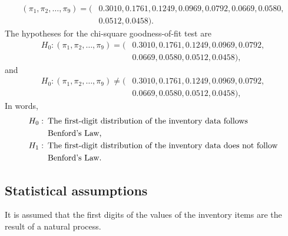 \begin{equation*}
\begin{aligned}
(\pi_1,\pi_2,\ldots,\pi_9) = (&0.3010, 0.1761, 0.1249, 0.0969, 0.0792, 0.0669, 0.0580, \\
&0.0512, 0.0458).
\end{aligned}
\end{equation*}
The hypotheses for the chi-square goodness-of-fit test are
\begin{equation*}
\begin{aligned}
H_0 : (\pi_1,\pi_2,\ldots,\pi_9) = (&0.3010, 0.1761, 0.1249, 0.0969, 0.0792, \\
&0.0669, 0.0580, 0.0512, 0.0458),
\end{aligned}
\end{equation*}
and
\begin{equation*}
\begin{aligned}
H_0 : (\pi_1,\pi_2,\ldots,\pi_9) \neq (&0.3010, 0.1761, 0.1249, 0.0969, 0.0792, \\
&0.0669, 0.0580, 0.0512, 0.0458),
\end{aligned}
\end{equation*}
In words,
\begin{equation*}
\begin{aligned}
H_0 : &\hspace{0.5em} \text{The first-digit distribution of the inventory data follows } \\
&\hspace{0.5em} \text{Benford's Law,} \\
H_1 : &\hspace{0.5em} \text{The first-digit distribution of the inventory data does not follow} \\
&\hspace{0.5em} \text{Benford's Law.}
\end{aligned}
\end{equation*}

\subsection{Statistical assumptions}

It is assumed that the first digits of the values of the inventory items are the result of a natural process.

